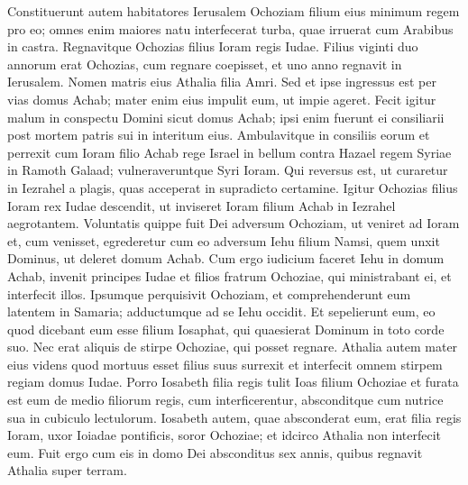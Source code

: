 \begin{biblechapter}
\begin{biblechapter}
\begin{biblechapter}
\begin{biblechapter}
\begin{biblechapter}
\begin{biblechapter}
\begin{biblechapter}
\begin{biblechapter}
\begin{biblechapter}
\begin{biblechapter}
\begin{biblechapter}
\begin{biblechapter}
\begin{biblechapter}
\begin{biblechapter}
\begin{biblechapter}
\begin{biblechapter}
\begin{biblechapter}
\begin{biblechapter}
\begin{biblechapter}
\begin{biblechapter}
\begin{biblechapter}
\begin{biblechapter}
\verse Constituerunt autem habitatores Ierusalem Ochoziam filium eius minimum regem pro eo; omnes enim maiores natu interfecerat turba, quae irruerat cum Arabibus in castra. Regnavitque Ochozias filius Ioram regis Iudae. 
\verse Filius viginti duo annorum erat Ochozias, cum regnare coepisset, et uno anno regnavit in Ierusalem. Nomen matris eius Athalia filia Amri. 
\verse Sed et ipse ingressus est per vias domus Achab; mater enim eius impulit eum, ut impie ageret. 
\verse Fecit igitur malum in conspectu Domini sicut domus Achab; ipsi enim fuerunt ei consiliarii post mortem patris sui in interitum eius. 
\verse Ambulavitque in consiliis eorum et perrexit cum Ioram filio Achab rege Israel in bellum contra Hazael regem Syriae in Ramoth Galaad; vulneraveruntque Syri Ioram. 
\verse Qui reversus est, ut curaretur in Iezrahel a plagis, quas acceperat in supradicto certamine.
 Igitur Ochozias filius Ioram rex Iudae descendit, ut inviseret Ioram filium Achab in Iezrahel aegrotantem. 
\verse Voluntatis quippe fuit Dei adversum Ochoziam, ut veniret ad Ioram et, cum venisset, egrederetur cum eo adversum Iehu filium Namsi, quem unxit Dominus, ut deleret domum Achab. 
\verse Cum ergo iudicium faceret Iehu in domum Achab, invenit principes Iudae et filios fratrum Ochoziae, qui ministrabant ei, et interfecit illos. 
\verse Ipsumque perquisivit Ochoziam, et comprehenderunt eum latentem in Samaria; adductumque ad se Iehu occidit. Et sepelierunt eum, eo quod dicebant eum esse filium Iosaphat, qui quaesierat Dominum in toto corde suo.
 Nec erat aliquis de stirpe Ochoziae, qui posset regnare. 
\verse Athalia autem mater eius videns quod mortuus esset filius suus surrexit et interfecit omnem stirpem regiam domus Iudae. 
\verse Porro Iosabeth filia regis tulit Ioas filium Ochoziae et furata est eum de medio filiorum regis, cum interficerentur, absconditque cum nutrice sua in cubiculo lectulorum. Iosabeth autem, quae absconderat eum, erat filia regis Ioram, uxor Ioiadae pontificis, soror Ochoziae; et idcirco Athalia non interfecit eum. 
\verse Fuit ergo cum eis in domo Dei absconditus sex annis, quibus regnavit Athalia super terram.
 

\end{biblechapter}
\end{biblechapter}
\end{biblechapter}
\end{biblechapter}
\end{biblechapter}
\end{biblechapter}
\end{biblechapter}
\end{biblechapter}
\end{biblechapter}
\end{biblechapter}
\end{biblechapter}
\end{biblechapter}
\end{biblechapter}
\end{biblechapter}
\end{biblechapter}
\end{biblechapter}
\end{biblechapter}
\end{biblechapter}
\end{biblechapter}
\end{biblechapter}
\end{biblechapter}
\end{biblechapter}

